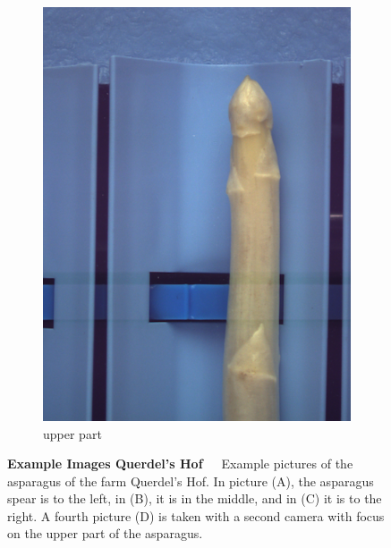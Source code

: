 \begin{figure}[!ht]
	\begin{subfigure}{0.3\textwidth}
		\vspace{10pt}
		\includegraphics[width=0.9\linewidth]{Figures/chapter02/querdel_d.png}
		\caption{upper part}
	\end{subfigure}
    \caption[Example Asparagus Images Querdel's Hof]{\textbf{Example Images Querdel's Hof}~~~Example pictures of the asparagus of the farm Querdel's Hof. In picture (A), the asparagus spear is to the left, in (B), it is in the middle, and in (C) it is to the right. A fourth picture (D) is taken with a second camera with focus on the upper part of the asparagus.}
    \label{fig:ExampleImagesQuerdel}
\end{figure}

